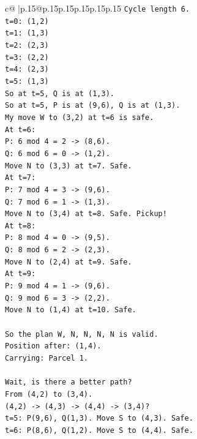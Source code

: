 \documentclass{article}
\begin{document}
{\begin{supertabular}{c@{$\;$}|p{.15\linewidth}@{}p{.15\linewidth}p{.15\linewidth}p{.15\linewidth}p{.15\linewidth}p{.15\linewidth}}
{{{\texttt{Cycle length 6.} \\
\texttt{t=0: (1,2)} \\
\texttt{t=1: (1,3)} \\
\texttt{t=2: (2,3)} \\
\texttt{t=3: (2,2)} \\
\texttt{t=4: (2,3)} \\
\texttt{t=5: (1,3)} \\
\texttt{So at t=5, Q is at (1,3).} \\
\texttt{So at t=5, P is at (9,6), Q is at (1,3).} \\
\texttt{My move W to (3,2) at t=6 is safe.} \\
\texttt{At t=6:} \\
\texttt{P: 6 mod 4 = 2 {-}> (8,6).} \\
\texttt{Q: 6 mod 6 = 0 {-}> (1,2).} \\
\texttt{Move N to (3,3) at t=7. Safe.} \\
\texttt{At t=7:} \\
\texttt{P: 7 mod 4 = 3 {-}> (9,6).} \\
\texttt{Q: 7 mod 6 = 1 {-}> (1,3).} \\
\texttt{Move N to (3,4) at t=8. Safe. Pickup!} \\
\texttt{At t=8:} \\
\texttt{P: 8 mod 4 = 0 {-}> (9,5).} \\
\texttt{Q: 8 mod 6 = 2 {-}> (2,3).} \\
\texttt{Move N to (2,4) at t=9. Safe.} \\
\texttt{At t=9:} \\
\texttt{P: 9 mod 4 = 1 {-}> (9,6).} \\
\texttt{Q: 9 mod 6 = 3 {-}> (2,2).} \\
\texttt{Move N to (1,4) at t=10. Safe.} \\
\\ 
\texttt{So the plan W, N, N, N, N is valid.} \\
\texttt{Position after: (1,4).} \\
\texttt{Carrying: Parcel 1.} \\
\\ 
\texttt{Wait, is there a better path?} \\
\texttt{From (4,2) to (3,4).} \\
\texttt{(4,2) {-}> (4,3) {-}> (4,4) {-}> (3,4)?} \\
\texttt{t=5: P(9,6), Q(1,3). Move S to (4,3). Safe.} \\
\texttt{t=6: P(8,6), Q(1,2). Move S to (4,4). Safe.} \\
}}}
\end{supertabular}}
\end{document}
